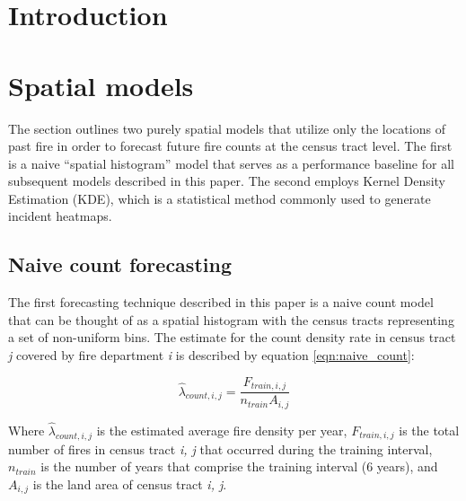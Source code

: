 \documentclass{svjour3}
\begin{document}
\abstract


\section{Introduction}
  
\section{Spatial models}
The section outlines two purely spatial models that utilize only the locations of past fire in order to forecast future fire counts at the census tract level. The first is a naive ``spatial histogram'' model that serves as a performance baseline for all subsequent models described in this paper. The second employs Kernel Density Estimation (KDE), which is a statistical method commonly used to generate incident heatmaps. 

\subsection{Naive count forecasting}
The first forecasting technique described in this paper is a naive count model that can be thought of as a spatial histogram with the census tracts representing a set of non-uniform bins. The estimate for the count density rate in census tract \textit{j} covered by fire department \textit{i} is described by equation \ref{eqn:naive_count}:

\begin{equation}
  \label{eqn:naive_count}
  \hat{\lambda}_{count,i,j} = \frac{F_{train,i,j}}{n_{train}A_{i,j}} 
\end{equation}

Where $\hat{\lambda}_{count,i,j}$ is the estimated average fire density per year, $F_{train,i,j}$ is the total number of fires in census tract \textit{i, j} that occurred during the training interval, $n_{train}$ is the number of years that comprise the training interval (6 years), and $A_{i,j}$ is the land area of census tract \textit{i, j}.






\clearpage


\end{document}
